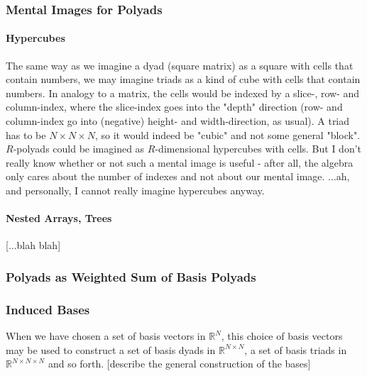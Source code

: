 \subsubsection{Mental Images for Polyads}

\paragraph{Hypercubes}
The same way as we imagine a dyad (square matrix) as a square with cells that contain numbers, we may imagine triads as a kind of cube with cells that contain numbers. In analogy to a matrix, the cells would be indexed by a slice-, row- and column-index, where the slice-index goes into the "depth" direction (row- and column-index go into (negative) height- and width-direction, as usual). A triad has to be $N \times N \times N$, so it would indeed be "cubic" and not some general "block". $R$-polyads could be imagined as $R$-dimensional hypercubes with cells. But I don't really know whether or not such a mental image is useful - after all, the algebra only cares about the number of indexes and not about our mental image. ...ah, and personally, I cannot really imagine hypercubes anyway. 

\paragraph{Nested Arrays, Trees}
[...blah blah]



\subsubsection{Polyads as Weighted Sum of Basis Polyads}


\subsubsection{Induced Bases} When we have chosen a set of basis vectors in $\mathbb{R}^N$, this choice of basis vectors may be used to construct a set of basis dyads in $\mathbb{R}^{N \times N}$, a set of basis triads in $\mathbb{R}^{N \times N \times N}$ and so forth. 
[describe the general construction of the bases]
\newline









